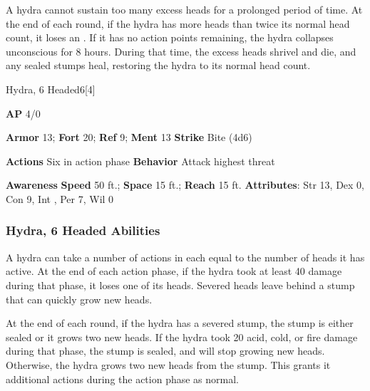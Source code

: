 A hydra cannot sustain too many excess heads for a prolonged period of time.
At the end of each round, if the hydra has more heads than twice its normal head count, it loses an .
If it has no action points remaining, the hydra collapses unconscious for 8 hours.
During that time, the excess heads shrivel and die, and any sealed stumps heal, restoring the hydra to its normal head count.

\begin{monsection}{Hydra, 6 Headed}{6}[4]
\vspace{-1em}\vspace{-1em}
\begin{spellcontent}
\begin{spelltargetinginfo}
{\textbf{AP} 4/0}

\pari \textbf{Armor} 13;
\textbf{Fort} 20;
\textbf{Ref} 9;
\textbf{Ment} 13
\pari \textbf{Strike} Bite  (4d6)


\pari \textbf{Actions} Six in action phase
\pari \textbf{Behavior} Attack highest threat
\end{spelltargetinginfo}
\end{spellcontent}

\begin{monsterfooter}
\pari \textbf{Awareness} 
\pari \textbf{Speed} 50 ft.;
\textbf{Space} 15 ft.;
\textbf{Reach} 15 ft.
\pari \textbf{Attributes}:
Str 13,
Dex 0,
Con 9,
Int ,
Per 7,
Wil 0
\end{monsterfooter}
\end{monsection}


\subsubsection{Hydra, 6 Headed Abilities}

A hydra can take a number of actions in each  equal to the number of heads it has active.
At the end of each action phase, if the hydra took at least 40 damage during that phase, it loses one of its heads.
Severed heads leave behind a stump that can quickly grow new heads.

At the end of each round, if the hydra has a severed stump, the stump is either sealed or it grows two new heads.
If the hydra took 20 acid, cold, or fire damage during that phase, the stump is sealed, and will stop growing new heads.
Otherwise, the hydra grows two new heads from the stump.
This grants it additional actions during the action phase as normal.

